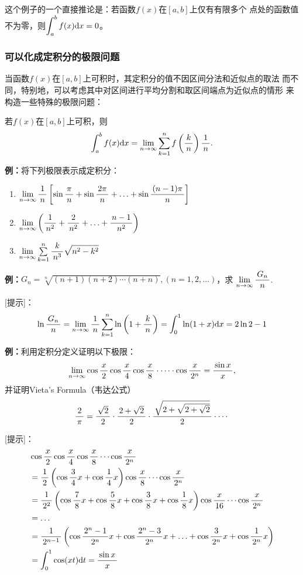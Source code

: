 这个例子的一个直接推论是：若函数$f(x)$在$[a,b]$上仅有有限多个
点处的函数值不为零，则$\dint_a^bf(x)\d x=0$。

\subsubsection{可以化成定积分的极限问题}

当函数$f(x)$在$[a,b]$上可积时，其定积分的值不因区间分法和近似点的取法
而不同，特别地，可以考虑其中对区间进行平均分割和取区间端点为近似点的情形
来构造一些特殊的极限问题：

\begin{thx}
	若$f(x)$在$[a,b]$上可积，则
	$$\dint_a^bf(x)\d x=\limn\sum\limits_{k=1}^nf\left(\df kn\right)\df1n.$$
\end{thx}

{\bf 例：}将下列极限表示成定积分：
\begin{enumerate}[(1)]
  \setlength{\itemindent}{1cm}
  \item $\limn\df 1n\left[\sin\df{\pi}{n}+\sin\df{2\pi}{n}+\ldots
  +\sin\df{(n-1)\pi}{n}\right]$ 
  \item $\limn\left(\df{1}{n^2}+\df{2}{n^2}+\ldots+\df{n-1}{n^2}\right)$
  \item $\limn\sum\limits_{k=1}^n\df{k}{n^3}\sqrt{n^2-k^2}$
\end{enumerate}

{\bf 例：}$G_n=\sqrt[n]{(n+1)(n+2)\cdots(n+n)},(n=1,2,\ldots)$，求
$\limn\df{G_n}n$.

[提示]：
$$\ln\df{G_n}n=\limn\df1n\sum\limits_{k=1}^n\ln\left(1+\df kn\right)
=\dint_0^1\ln(1+x)\d x=2\ln2-1$$

\begin{shaded}
{\bf 例：}利用定积分定义证明以下极限：
$$\limn\cos\df x2\cos\df x4\cos\df x8\cdot\cdots\cdot\cos\df x{2^n}
=\df{\sin x}x,$$
并证明Vieta's Formula（韦达公式）
$$\df2\pi=\df{\sqrt2}2\cdot\df{2+\sqrt2}2\cdot\df{\sqrt{2+\sqrt{2+\sqrt2}}}2
\cdot\cdots$$

[提示]：
\begin{align}
	&\cos\df x2\cos\df x4\cos\df x8\cdots\cos\df x{2^n}\notag\\
	&=\df12\left(\cos\df34x+\cos\df14x\right)\cos\df x8\cdots\cos\df
	x{2^n}\notag\\
	&=\df1{2^2}\left(\cos\df78x+\cos\df58x+\cos\df38x+\cos\df18x\right)
	\cos\df x{16}\cdots\cos\df x{2^n}\notag\\
	&=\ldots\notag\\
	&=\df1{2^{n-1}}\left(\cos\df{2^n-1}{2^n}x+\cos\df{2^n-3}{2^n}x+
	\ldots+\cos\df3{2^n}x+\cos\df1{2^n}x\right)\notag\\
	&=\dint_0^1\cos(xt)\d t=\df{\sin x}x\notag
\end{align}
\end{shaded}


